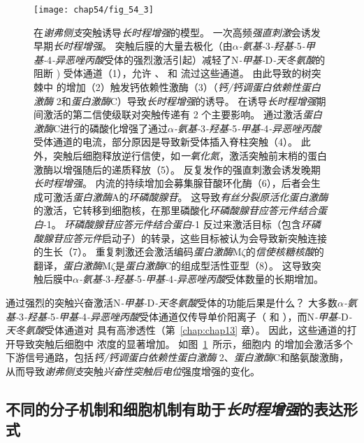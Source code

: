 \begin{figure}[htbp]
	\centering
	\texttt{[image: chap54/fig\_54\_3]}
	\caption{在\textit{谢弗侧支}突触诱导\textit{长时程增强}的模型。
		一次高频\textit{强直刺激}会诱发早期\textit{长时程增强}。
		突触后膜的大量去极化（由\textit{$\alpha$-氨基-}3\textit{-羟基-}5\textit{-甲基-}4\textit{-异恶唑丙酸}受体的强烈激活引起）减轻了N\textit{-甲基-}D\textit{-天冬氨酸}的  阻断 ) 受体通道（1），允许 、 和  流过这些通道。
		由此导致的树突棘中  的增加（2）触发钙依赖性激酶（3）（\textit{钙/钙调蛋白依赖性蛋白激酶} 2和\textit{蛋白激酶}C）导致\textit{长时程增强}的诱导。
		在诱导\textit{长时程增强}期间激活的第二信使级联对突触传递有 2 个主要影响。
		通过激活\textit{蛋白激酶}C进行的磷酸化增强了通过\textit{$\alpha$-氨基-}3\textit{-羟基-}5\textit{-甲基-}4\textit{-异恶唑丙酸}受体通道的电流，部分原因是导致新受体插入脊柱突触（4）。
		此外，突触后细胞释放逆行信使，如\textit{一氧化氮}，激活突触前末梢的蛋白激酶以增强随后的递质释放（5）。
		反复发作的强直刺激会诱发晚期\textit{长时程增强}。
		 内流的持续增加会募集腺苷酸环化酶（6），后者会生成可激活\textit{蛋白激酶}A的\textit{环磷酸腺苷}。
		这导致\textit{有丝分裂原活化蛋白激酶}的激活，它转移到细胞核，在那里磷酸化\textit{环磷酸腺苷应答元件结合蛋白}-1。
		\textit{环磷酸腺苷应答元件结合蛋白}-1 反过来激活目标（包含\textit{环磷酸腺苷应答元件}启动子）的转录，这些目标被认为会导致新突触连接的生长（7）。
		重复刺激还会激活编码\textit{蛋白激酶}M$\zeta$的\textit{信使核糖核酸}的翻译，\textit{蛋白激酶}M$\zeta$是\textit{蛋白激酶}C的组成型活性亚型（8）。
		这导致突触后膜中\textit{$\alpha$-氨基-}3\textit{-羟基-}5\textit{-甲基-}4\textit{-异恶唑丙酸}受体数量的长期增加。}
	\label{fig:54_3}
\end{figure}


通过强烈的突触兴奋激活N\textit{-甲基-}D\textit{-天冬氨酸}受体的功能后果是什么？
大多数\textit{$\alpha$-氨基-}3\textit{-羟基-}5\textit{-甲基-}4\textit{-异恶唑丙酸}受体通道仅传导单价阳离子（ 和 ），而N\textit{-甲基-}D\textit{-天冬氨酸}受体通道对  具有高渗透性（第~\ref{chap:chap13} 章）。
因此，这些通道的打开导致突触后细胞中  浓度的显著增加。
如图~\ref{fig:54_3}~所示，细胞内  的增加会激活多个下游信号通路，包括\textit{钙/钙调蛋白依赖性蛋白激酶} 2、\textit{蛋白激酶}C和酪氨酸激酶，从而导致\textit{谢弗侧支}突触\textit{兴奋性突触后电位}强度增强的变化。



\subsection{不同的分子机制和细胞机制有助于\textit{长时程增强}的表达形式}


